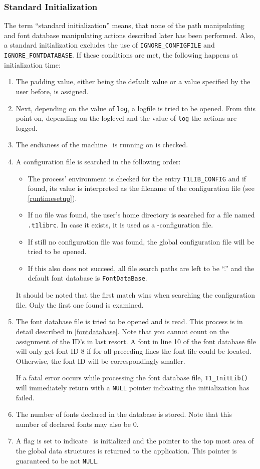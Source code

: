 \subsubsection{Standard Initialization}
\label{standardinitialization}%
The term ``standard initialization'' means, that none of the path manipulating
and font database manipulating actions described later has been
performed. Also, a standard initialization excludes the use of
\verb+IGNORE_CONFIGFILE+ and \verb+IGNORE_FONTDATABASE+. If these conditions
are met, the following happens at initialization time:
\begin{enumerate}
\item The padding value, either being the default value or a value specified
  by the user before, is assigned.
\item Next, depending on the value of \verb+log+, a logfile is tried to be
  opened. From this point on, depending on the loglevel and the value of
  \verb+log+ the actions are logged.
\item The endianess of the machine \tonelib\ is running on is checked. 
\item A configuration file is searched in the following order:
  \begin{itemize}
  \item The process' environment is checked for the entry \verb+T1LIB_CONFIG+
  and if found, its value is interpreted as the filename of the configuration
  file (see \ref{runtimesetup}).
  \item If no file was found, the user's home directory is searched for a file
    named \verb+.t1librc+. In case it exists, it is used as a
    \tonelib-configuration file. 
  \item If still no configuration file was found, the global configuration
    file will be tried to be opened.
  \item If this also does not succeed, all file search paths are left to be
    ``.'' and the default font database is \verb+FontDataBase+.
  \end{itemize}
  It should be noted that the first match wins when searching the configuration
  file. Only the first one found is examined.
\item The font database file is tried to be opened and is read. This process
  is in detail described in \ref{fontdatabase}. Note that you cannot count on
  the assignment of the ID's in last resort. A font in line 10 of the font 
  database file will only get font ID 8 if for all preceding lines the font
  file could be located. Otherwise, the font ID will be correspondingly
  smaller. 

  If a fatal error occurs while processing the font database file,
  \verb+T1_InitLib()+ will immediately return with a \verb+NULL+ pointer
  indicating the initialization has failed. 
\item The number of fonts declared in the database is stored. Note that this
  number of declared fonts may also be 0.
\item A flag is set to indicate \tonelib\ is initialized and the pointer to
  the top most area of the global data structures is returned to the
  application. This pointer is guaranteed to be not \verb+NULL+.
\end{enumerate}

